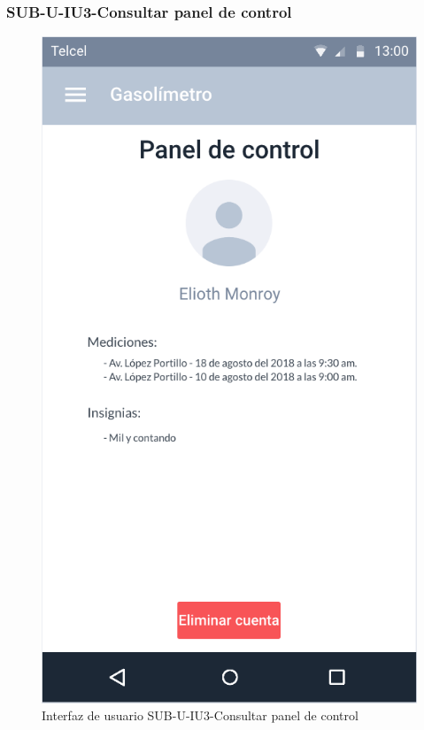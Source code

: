 \subsubsection{SUB-U-IU3-Consultar panel de control}\label{SUB-U-IU3}
\begin{figure}[H]
	\centering
	\includegraphics[scale=.55]{Capitulo4/software/submodulos/usuarios/images/sub-u-iu3}
	\caption{Interfaz de usuario SUB-U-IU3-Consultar panel de control}
	\label{fig:sub-u-iu3}
\end{figure}